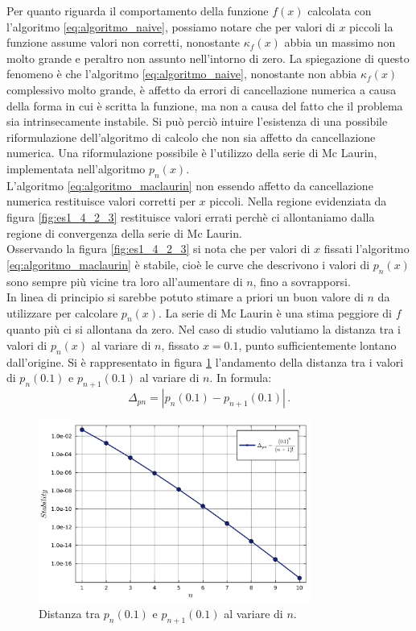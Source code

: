 \documentclass[letterpaper, 12pt]{article}
\numberwithin{equation}{section}    %
\begin{document}
Per quanto riguarda il comportamento della funzione $f(x)$ calcolata con l'algoritmo \ref{eq:algoritmo_naive},
possiamo notare che per valori di $x$ piccoli la funzione assume valori non corretti, nonostante $\kappa_f(x)$ 
abbia un massimo non molto
grande e peraltro non assunto nell'intorno di zero. La spiegazione di questo fenomeno è che l'algoritmo
\ref{eq:algoritmo_naive}, nonostante non abbia $\kappa_f(x)$ complessivo molto grande, è affetto da errori 
di cancellazione numerica a causa della forma in cui è scritta la funzione, ma non a causa del fatto che 
il problema sia intrinsecamente instabile. Si può perciò intuire l'esistenza di una possibile riformulazione
dell'algoritmo di calcolo che non sia affetto da cancellazione numerica. 
Una riformulazione possibile è l'utilizzo della
serie di Mc Laurin, implementata nell'algoritmo $p_n(x)$. \\
L'algoritmo \ref{eq:algoritmo_maclaurin} non essendo affetto da cancellazione numerica restituisce
valori corretti per $x$ piccoli. Nella regione evidenziata da
figura \ref{fig:es1_4_2_3} restituisce valori errati
perchè ci allontaniamo dalla regione di convergenza della serie di Mc Laurin. \\
Osservando la figura \ref{fig:es1_4_2_3} si nota che per valori di $x$ fissati l'algoritmo 
\ref{eq:algoritmo_maclaurin} è stabile, cioè le curve che descrivono i valori di $p_n(x)$ sono sempre più 
vicine tra loro all'aumentare di $n$, fino a sovrapporsi. \\
In linea di principio si sarebbe potuto stimare a priori un buon valore di $n$ da utilizzare
per calcolare $p_n(x)$. La serie di Mc Laurin è una stima peggiore di $f$ quanto più ci si
allontana da zero. Nel caso di studio valutiamo la distanza tra i valori di $p_n(x)$ al variare di $n$,
fissato $x = 0.1$, punto sufficientemente lontano dall'origine. 
Si è rappresentato in figura \ref{fig:es1_4_2_4} l'andamento della distanza tra i valori
di $p_n(0.1)$ e $p_{n+1}(0.1)$ al variare di $n$. In formula:
\begin{equation}
    \Delta_{pn} = |p_n(0.1) - p_{n+1}(0.1)|\,.
\end{equation}
\begin{figure}[!ht]
    \centering
    \includegraphics[width=0.8\textwidth]{1424.pdf}
    \caption{Distanza tra $p_n(0.1)$ e $p_{n+1}(0.1)$ al variare di $n$.}
    \label{fig:es1_4_2_4}
\end{figure}
\end{document}
